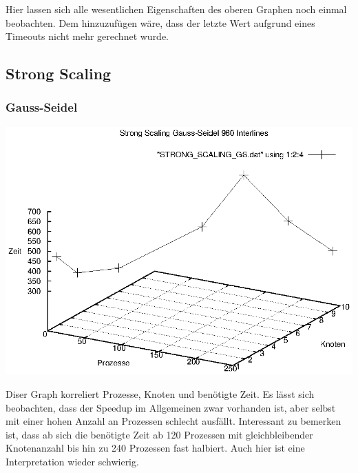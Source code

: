 \documentclass[a4paper,12pt]{scrartcl}
\begin{document}
Hier lassen sich alle wesentlichen Eigenschaften des oberen Graphen noch 
einmal beobachten. Dem hinzuzufügen wäre, dass der letzte Wert aufgrund eines 
Timeouts nicht mehr gerechnet wurde.

\newpage

\subsection{Strong Scaling}
\subsubsection{Gauss-Seidel}
\begin{multicols}{2}
\includegraphics[scale=0.5]{results/STRONG_SCALING_GS.eps}

\end{multicols}

Diser Graph korreliert Prozesse, Knoten und benötigte Zeit. Es lässt sich
beobachten, dass der Speedup im Allgemeinen zwar vorhanden ist, aber selbst
mit einer hohen Anzahl an Prozessen schlecht ausfällt.
Interessant zu bemerken ist, dass ab sich die benötigte Zeit ab 120 Prozessen
mit gleichbleibender Knotenanzahl bis hin zu 240 Prozessen fast halbiert.
Auch hier ist eine Interpretation wieder schwierig.
\end{document}
